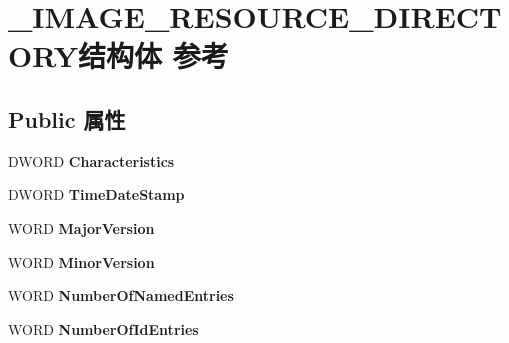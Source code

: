 \hypertarget{struct___i_m_a_g_e___r_e_s_o_u_r_c_e___d_i_r_e_c_t_o_r_y}{}\section{\+\_\+\+I\+M\+A\+G\+E\+\_\+\+R\+E\+S\+O\+U\+R\+C\+E\+\_\+\+D\+I\+R\+E\+C\+T\+O\+R\+Y结构体 参考}
\label{struct___i_m_a_g_e___r_e_s_o_u_r_c_e___d_i_r_e_c_t_o_r_y}
\subsection*{Public 属性}
\begin{DoxyCompactItemize}
\item 
\mbox{\label{struct___i_m_a_g_e___r_e_s_o_u_r_c_e___d_i_r_e_c_t_o_r_y_a9f99e5ddd955da65f8b37d7168c9b45b}} 
D\+W\+O\+RD {\bfseries Characteristics}
\item 
\mbox{\label{struct___i_m_a_g_e___r_e_s_o_u_r_c_e___d_i_r_e_c_t_o_r_y_a1354099cead8b8d82adb70620d9d5cb2}} 
D\+W\+O\+RD {\bfseries Time\+Date\+Stamp}
\item 
\mbox{\label{struct___i_m_a_g_e___r_e_s_o_u_r_c_e___d_i_r_e_c_t_o_r_y_a25373197ea4024cfafa356c2e73be9f9}} 
W\+O\+RD {\bfseries Major\+Version}
\item 
\mbox{\label{struct___i_m_a_g_e___r_e_s_o_u_r_c_e___d_i_r_e_c_t_o_r_y_a93a46c5a5f0de37d1b04a82f730cba8c}} 
W\+O\+RD {\bfseries Minor\+Version}
\item 
\mbox{\label{struct___i_m_a_g_e___r_e_s_o_u_r_c_e___d_i_r_e_c_t_o_r_y_af8f5578ea62f726a73e7fe933778ea01}} 
W\+O\+RD {\bfseries Number\+Of\+Named\+Entries}
\item 
\mbox{\label{struct___i_m_a_g_e___r_e_s_o_u_r_c_e___d_i_r_e_c_t_o_r_y_a4eece00df426a4d178e5f818d0904b66}} 
W\+O\+RD {\bfseries Number\+Of\+Id\+Entries}

\end{DoxyCompactItemize}
